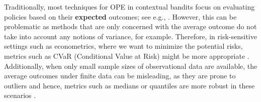 Traditionally, most techniques for OPE in contextual bandits focus on evaluating policies based on their \textbf{expected} outcomes; see e.g., \cite{uncertainty5, adaptive-ope, uncertainty2, uncertainty3, uncertainty4, doubly-robust}.
However, this can be problematic as methods that are only concerned with the average outcome do not take into account any notions of variance, for example. Therefore, in risk-sensitive settings such as econometrics, where we want to minimize the potential risks, metrics such as CVaR (Conditional Value at Risk) might be more appropriate \citep{keramati2020being}. Additionally, when only small sample sizes of observational data are available, the average outcomes under finite data can be misleading, as they are prone to outliers and hence, metrics such as medians or quantiles are more robust in these scenarios \citep{altschuler2019best}.

